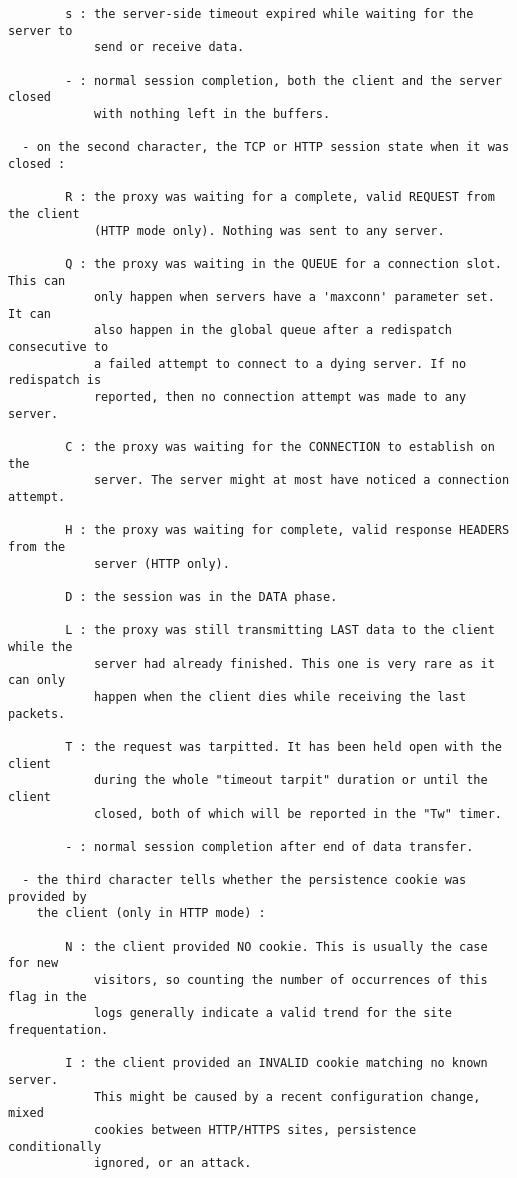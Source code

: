\begin{verbatim}
        s : the server-side timeout expired while waiting for the server to
            send or receive data.

        - : normal session completion, both the client and the server closed
            with nothing left in the buffers.

  - on the second character, the TCP or HTTP session state when it was closed :

        R : the proxy was waiting for a complete, valid REQUEST from the client
            (HTTP mode only). Nothing was sent to any server.

        Q : the proxy was waiting in the QUEUE for a connection slot. This can
            only happen when servers have a 'maxconn' parameter set. It can
            also happen in the global queue after a redispatch consecutive to
            a failed attempt to connect to a dying server. If no redispatch is
            reported, then no connection attempt was made to any server.

        C : the proxy was waiting for the CONNECTION to establish on the
            server. The server might at most have noticed a connection attempt.

        H : the proxy was waiting for complete, valid response HEADERS from the
            server (HTTP only).

        D : the session was in the DATA phase.

        L : the proxy was still transmitting LAST data to the client while the
            server had already finished. This one is very rare as it can only
            happen when the client dies while receiving the last packets.

        T : the request was tarpitted. It has been held open with the client
            during the whole "timeout tarpit" duration or until the client
            closed, both of which will be reported in the "Tw" timer.

        - : normal session completion after end of data transfer.

  - the third character tells whether the persistence cookie was provided by
    the client (only in HTTP mode) :

        N : the client provided NO cookie. This is usually the case for new
            visitors, so counting the number of occurrences of this flag in the
            logs generally indicate a valid trend for the site frequentation.

        I : the client provided an INVALID cookie matching no known server.
            This might be caused by a recent configuration change, mixed
            cookies between HTTP/HTTPS sites, persistence conditionally
            ignored, or an attack.


\end{verbatim}
